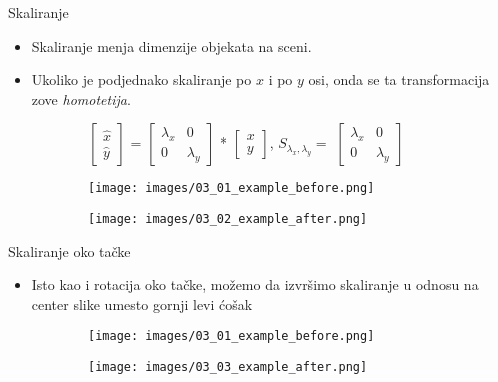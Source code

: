 \documentclass[bookmarks=true,bookmarksopen=true,pdfborder={0 0 0},pdfhighlight={/N},linkbordercolor={.5 .5 .5},implicit=false,unicode,xcolor={table}]{beamer}
\begin{document}
\begin{frame}{Skaliranje}

  \begin{itemize}
    \item Skaliranje menja dimenzije objekata na sceni.
    \item Ukoliko je podjednako skaliranje po $x$ i po $y$ osi, onda se ta transformacija zove \textit{homotetija}.
  \end{itemize}
  \begin{figure}
    \begin{subfigure}{9cm}
      $\begin{bmatrix}
        \hat{x}\\
        \hat{y}
        \end{bmatrix}$
      =
      $\begin{bmatrix}
        \lambda_{x} & 0\\
        0 & \lambda_{y}
        \end{bmatrix}$
      *
      $\begin{bmatrix}
        x\\
        y
        \end{bmatrix}$,
      \hfill
      $S_{\lambda_{x}, \lambda_{y}} =$
      $\begin{bmatrix}
        \lambda_{x} & 0\\
        0 & \lambda_{y}
        \end{bmatrix}$
    \end{subfigure}
  \end{figure}
  
  \begin{figure}
    \begin{subfigure}{5cm}
      \texttt{[image: images/03\_01\_example\_before.png]}
    \end{subfigure}
    \begin{subfigure}{5cm}
      \texttt{[image: images/03\_02\_example\_after.png]}
    \end{subfigure}
  \end{figure}

\end{frame}

\begin{frame}{Skaliranje oko tačke}

  \begin{itemize}
    \item Isto kao i rotacija oko tačke, možemo da izvršimo skaliranje u odnosu na center slike umesto gornji levi ćošak
  \end{itemize}
  
  \begin{figure}
    \begin{subfigure}{5cm}
      \texttt{[image: images/03\_01\_example\_before.png]}
    \end{subfigure}
    \begin{subfigure}{5cm}
      \texttt{[image: images/03\_03\_example\_after.png]}
    \end{subfigure}
  \end{figure}

\end{frame}
\end{document}
